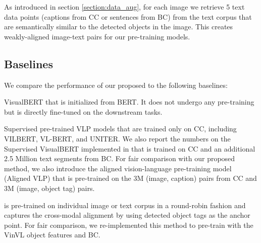 As introduced in section \ref{section:data_aug}, for each image we retrieve 5 text data points (captions from CC or sentences from BC) from the text corpus that are semantically similar to the detected objects in the image. 
This creates weakly-aligned image-text pairs for our pre-training models. 

\subsection{Baselines}
We compare the performance of our proposed {\ModelName } to the following baselines: 

 VisualBERT that is initialized from BERT. It does not undergo any pre-training but is directly fine-tuned on the downstream tasks. 

 Supervised pre-trained VLP models that are trained only on CC, including VILBERT\cite{lu2019vilbert}, VL-BERT\cite{su2019vl}, and UNITER\cite{chen2020uniter}. We also report the numbers on the Supervised VisualBERT implemented in \uvisualbert\cite{li2020unsupervised} that is trained on CC and an additional 2.5 Million text segments from BC. 
For fair comparison with our proposed method, we also introduce the aligned vision-language pre-training model (Aligned VLP) that is pre-trained on the 3M (image, caption) pairs from CC and 3M (image, object tag) pairs. 

{\uvisualbert } is pre-trained on individual image or text corpus in a round-robin fashion and captures the cross-modal alignment by using detected object tags as the anchor point. 
For fair comparison, we re-implemented this method to pre-train with the VinVL object features\cite{zhang2021vinvl} and BC. 
